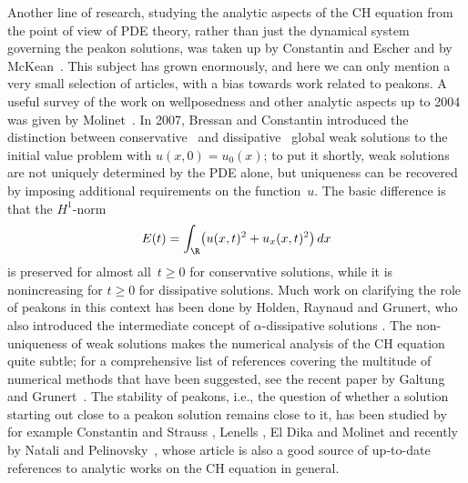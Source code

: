 \documentclass[10pt,a4paper]{article} \pdfoutput=1 
\begin{document}
Another line of research, studying the analytic aspects of the CH equation
from the point of view of PDE theory, rather than just the dynamical system
governing the peakon solutions,
was taken up by Constantin and Escher
\cite{constantin:1997:CH-periodic-cauchy-problem,
  constantin-escher:1998:CH-global-existence-blowup,
  constantin-escher:1998:CH-global-weak,
  constantin-escher:1998:wave-breaking-for-nonlinear-nonlocal-shallow-water-equations}
and by McKean~\cite{mckean:1998:CH-breakdown}.
This subject has grown enormously, and here we can only mention a very small selection of articles,
with a bias towards work related to peakons.
A useful survey of the work on wellposedness and other analytic aspects up to 2004
was given by Molinet~\cite{molinet:2004:CH-wellposedness-survey}.
In 2007, Bressan and Constantin introduced the distinction between
conservative~\cite{bressan-constantin:2007:global-conservative-CH}
and dissipative~\cite{bressan-constantin:2007:global-dissipative-CH}
global weak solutions to the initial value problem with $u(x,0)=u_0(x)$;
to put it shortly, weak solutions are not uniquely determined by the PDE alone,
but uniqueness can be recovered by imposing additional requirements on the function~$u$.
The basic difference is that the $H^1$-norm
\begin{equation*}
  E(t) = \int_\R \bigl( u(x,t)^2 + u_x(x,t)^2 \bigr) \, dx
\end{equation*}
is preserved for almost all~$t \ge 0$ for conservative solutions,
while it is nonincreasing for $t \ge 0$ for dissipative solutions.
Much work on clarifying the role of peakons in this context has been done by Holden, Raynaud and Grunert,
who also introduced the intermediate concept of $\alpha$-dissipative solutions
\cite{holden-raynaud:2007:CH-global-conservative-Lagrangian,
  holden-raynaud:2007:CH-global-conservative-multipeakon,
  holden-raynaud:2008:CH-periodic-conservative,
  holden-raynaud:2008:CH-global-dissipative-multipeakon,
  holden-raynaud:2009:CH-dissipative-solutions,
  grunert-holden-raynaud:2015:alpha-dissipative-2CH,
  grunert-holden:2016:CH-peakon-antipeakon-alpha-dissipative}.
The non-uniqueness of weak solutions makes the numerical analysis of the CH equation quite
subtle; for a comprehensive list of references covering the multitude of numerical methods
that have been suggested, see the recent paper by
Galtung and Grunert~\cite{galtung-grunert:2021:CH-numerical-study-of-variational-discretizations}.
The stability of peakons, i.e., the question of whether a solution starting out close to
a peakon solution remains close to it,
has been studied by for example Constantin and Strauss
\cite{constantin-strauss:2000:CH-stability-peakons,
  constantin-strauss:2002:CH-stability-solitons},
Lenells \cite{lenells:2004:variational-approach-stability-periodic-peakons:JNMP,
  lenells:2004:stability-periodic-peakons:IMRN},
El Dika and Molinet \cite{eldika-molinet:2009:CH-stability-multi-peakon-antipeakon,
  eldika-molinet:2009:CH-stability-multipeakon}
and recently by Natali and Pelinovsky~\cite{natali-pelinovsky:2020:CH-instability-of-H1-stable-peakons},
whose article is also a good source of up-to-date references to analytic works on the CH equation in general.
\end{document}
